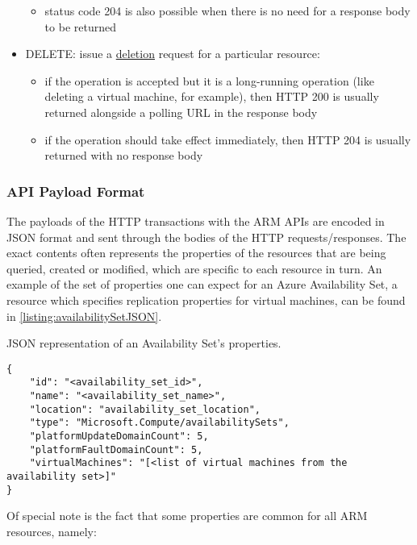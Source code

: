\documentclass[11pt]{report}
\begin{document}
\begin{itemize}
\begin{itemize}
            \item{} status code 204 is also possible when there is no need for
                a response body to be returned
        \end{itemize}
    \item{DELETE}: issue a \ul{deletion} request for a particular resource:
        \begin{itemize}
            \item{} if the operation is accepted but it is a long-running
                operation (like deleting a virtual machine, for example), then
                HTTP 200 is usually returned alongside a polling URL in the
                response body
            \item{} if the operation should take effect immediately, then HTTP
                204 is usually returned with no response body
        \end{itemize}
\end{itemize}

\subsubsection{API Payload Format}

The payloads of the HTTP transactions with the ARM APIs are encoded in JSON
format and sent through the bodies of the HTTP requests/responses. The exact
contents often represents the properties of the resources that are being
queried, created or modified, which are specific to each resource in turn.
An example of the set of properties one can expect for an Azure
Availability Set, a resource which specifies replication properties for virtual
machines, can be found in \autoref{listing:availabilitySetJSON}.

\begin{listing}[H]
\caption{JSON representation of an Availability Set's properties.}
\label{listing:availabilitySetJSON}
\begin{verbatim}
{
    "id": "<availability_set_id>",
    "name": "<availability_set_name>",
    "location": "availability_set_location",
    "type": "Microsoft.Compute/availabilitySets",
    "platformUpdateDomainCount": 5,
    "platformFaultDomainCount": 5,
    "virtualMachines": "[<list of virtual machines from the availability set>]"
}
\end{verbatim}
\end{listing}

Of special note is the fact that some properties are common for all ARM
resources, namely:
\end{document}
